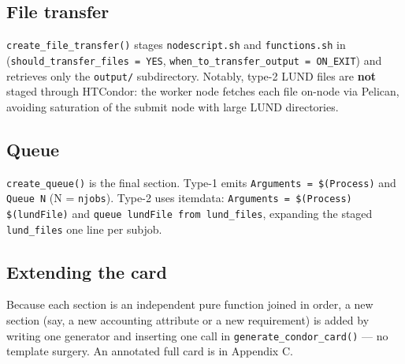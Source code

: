 \subsection{File transfer}

\texttt{create\_\allowbreak{}file\_\allowbreak{}transfer()} stages \texttt{nodescript.\allowbreak{}sh} and
\texttt{functions.\allowbreak{}sh} in (\texttt{should\_\allowbreak{}transfer\_\allowbreak{}files =\allowbreak{}
YES}, \texttt{when\_\allowbreak{}to\_\allowbreak{}transfer\_\allowbreak{}output =\allowbreak{}
ON\_\allowbreak{}EXIT}) and retrieves only the \texttt{output/\allowbreak{}} subdirectory. Notably, type-2 LUND
files are \textbf{not} staged through HTCondor: the worker node fetches each file on-node via Pelican, avoiding
saturation of the submit node with large LUND directories.

\subsection{Queue}

\texttt{create\_\allowbreak{}queue()} is the final section. Type-1 emits \texttt{Arguments =\allowbreak{}
\$(Process)} and \texttt{Queue N} (N = \texttt{njobs}). Type-2 uses itemdata: \texttt{Arguments =\allowbreak{}
\$(Process) \$(lundFile)} and \texttt{queue lundFile from lund\_\allowbreak{}files}, expanding the staged
\texttt{lund\_\allowbreak{}files} one line per subjob.

\subsection{Extending the card}

Because each section is an independent pure function joined in order, a new section (say, a new accounting
attribute or a new requirement) is added by writing one generator and inserting one call in
\texttt{generate\_\allowbreak{}condor\_\allowbreak{}card()} --- no template surgery. An annotated full card is
in Appendix C.
